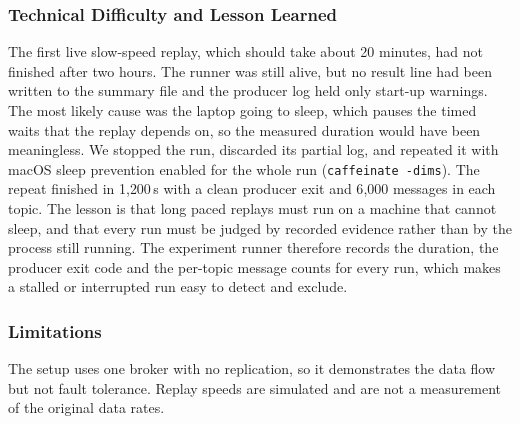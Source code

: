 \subsubsection{Technical Difficulty and Lesson Learned}
The first live slow-speed replay, which should take about 20 minutes, had not finished after two hours. The runner was still alive, but no result line had been written to the summary file and the producer log held only start-up warnings. The most likely cause was the laptop going to sleep, which pauses the timed waits that the replay depends on, so the measured duration would have been meaningless. We stopped the run, discarded its partial log, and repeated it with macOS sleep prevention enabled for the whole run (\texttt{caffeinate -dims}). The repeat finished in 1{,}200\,s with a clean producer exit and 6{,}000 messages in each topic. The lesson is that long paced replays must run on a machine that cannot sleep, and that every run must be judged by recorded evidence rather than by the process still running. The experiment runner therefore records the duration, the producer exit code and the per-topic message counts for every run, which makes a stalled or interrupted run easy to detect and exclude.

\subsubsection{Limitations}
The setup uses one broker with no replication, so it demonstrates the data flow
but not fault tolerance. Replay speeds are simulated and are not a measurement of
the original data rates.
